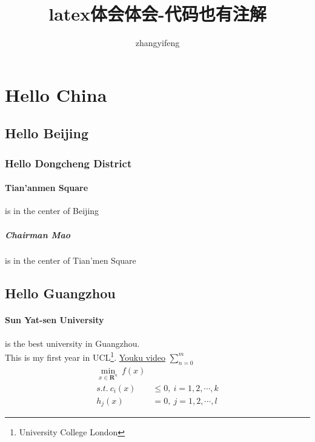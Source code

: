 \documentclass[UTF8]{ctexart} %
\title{\color{red} latex体会体会-代码也有注解} %
\author{zhangyifeng}
\begin{document}
\maketitle %
\tableofcontents %
	\section{Hello China} %
		\subsection{Hello Beijing} %
			\subsubsection{Hello Dongcheng District} %
				\paragraph{Tian'anmen Square} is in the center of Beijing
					\subparagraph{Chairman Mao} is in the center of Tian'men Square
		\subsection*{Hello Guangzhou} %
				\paragraph{Sun Yat-sen University} is the best university in Guangzhou.\\
				This is my first year in UCL\footnote{University College London}. %
				\href{http://v.youku.com/}{Youku video} %
				$\sum\limits_{n = 0}^{m}$ %
				\begin{equation}
				\begin{split}
				\min_{x\in \bm R^{n}}\ f(x) \\
				s.t.\  c_{i}(x)&\leq0, \ i=1,2,\cdots,k\\
				h_{j}(x)&=0, \ j=1,2,\cdots,l
				\end{split}
				\end{equation}
\end{document}
